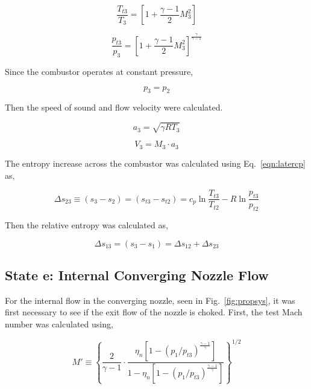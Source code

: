 \documentclass[conf]{new-aiaa} %
\begin{document}
\begin{equation}
    \label{eqn:T3}
    \frac{T_{t3}}{T_3}=\left[1+\frac{\gamma-1}{2}M_3^2\right]
\end{equation}

\begin{equation}
    \label{eqn:pt3}
    \frac{p_{t3}}{p_3}=\left[1+\frac{\gamma-1}{2}M_3^2\right]^\frac{\gamma}{\gamma-1}
\end{equation}

Since the combustor operates at constant pressure,

\begin{equation}
    \label{eqn:p3}
    p_3=p_2
\end{equation}

Then the speed of sound and flow velocity were calculated.

\begin{equation}
    \label{eqn:a3}
    a_3=\sqrt{\gamma RT_3}
\end{equation}

\begin{equation}
    \label{eqn:V3}
    V_3=M_3\cdot a_3
\end{equation}

The entropy increase across the combustor was calculated using Eq.~\eqref{eqn:latercp} as,

\begin{equation}
    \label{eqn:dels23}
    \Delta s_{23}\equiv\left(s_3-s_2\right)=\left(s_{t3}-s_{t2}\right)=c_p\ln\frac{T_{t3}}{T_{t2}}-R\ln\frac{p_{t3}}{p_{t2}}
\end{equation}

Then the relative entropy was calculated as,

\begin{equation}
    \label{eqn:dels13}
    \Delta s_{13}=(s_3-s_1)=\Delta s_{12}+\Delta s_{23}
\end{equation}

\subsection{State e: Internal Converging Nozzle Flow}
For the internal flow in the converging nozzle, seen in Fig.~\ref{fig:propsys}, it was first necessary to see if the exit flow of the nozzle is choked. First, the test Mach number was calculated using,

\begin{equation}
    \label{eqn:M'}
    M'\equiv\left\{\frac{2}{\gamma-1}\cdot\frac{\eta_n\left[1-\left(p_1/p_{t3}\right)^{\frac{\gamma-1}{\gamma}}\right]}{1-\eta_n\left[1-\left(p_1/p_{t3}\right)^{\frac{\gamma-1}{\gamma}}\right]}\right\}^{1/2}
\end{equation}
\end{document}
